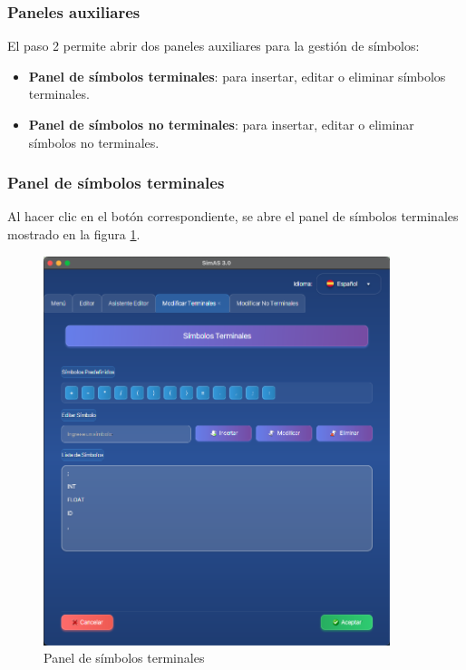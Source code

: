 \subsubsection{Paneles auxiliares}

El paso 2 permite abrir dos paneles auxiliares para la gestión de símbolos:

\begin{itemize}
    \item \textbf{Panel de símbolos terminales}: para insertar, editar o eliminar símbolos terminales.
    \item \textbf{Panel de símbolos no terminales}: para insertar, editar o eliminar símbolos no terminales.
\end{itemize}

\subsubsection{Panel de símbolos terminales}

Al hacer clic en el botón correspondiente, se abre el panel de símbolos terminales mostrado en la figura \ref{fig:panel_terminales}.

\needspace{8cm}
\begin{figure}[H]
    \centering
    \includegraphics[width=0.9\textwidth]{figuras/editor/panel_terminales.png}
    \caption{Panel de símbolos terminales}
    \label{fig:panel_terminales}
\end{figure}


